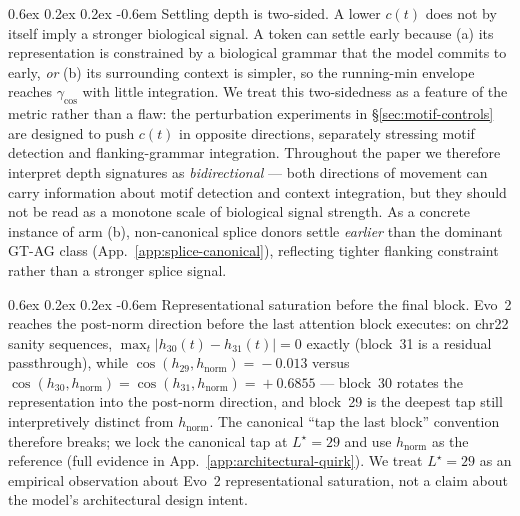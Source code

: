 \documentclass{article}
\makeatletter
\renewcommand\paragraph{\@startsection{paragraph}{4}{\z@}%
  {0.6ex \@plus 0.2ex \@minus 0.2ex}%
  {-0.6em}%
{\normalfont\normalsize\bfseries}}
\theoremstyle{plain}
\theoremstyle{definition}
\theoremstyle{remark}
\newcommand{\hnorm}{h_{\mathrm{norm}}}
\makeatother
\begin{document}
\paragraph{Settling depth is two-sided.} A lower $c(t)$ does not by itself imply a stronger biological signal. A token can settle early because (a) its representation is constrained by a biological grammar that the model commits to early, \emph{or} (b) its surrounding context is simpler, so the running-min envelope reaches $\gamma_{\cos}$ with little integration. We treat this two-sidedness as a feature of the metric rather than a flaw: the perturbation experiments in \S\ref{sec:motif-controls} are designed to push $c(t)$ in opposite directions, separately stressing motif detection and flanking-grammar integration. Throughout the paper we therefore interpret depth signatures as \emph{bidirectional} --- both directions of movement can carry information about motif detection and context integration, but they should not be read as a monotone scale of biological signal strength.
As a concrete instance of arm (b), non-canonical splice donors settle \emph{earlier} than the dominant GT-AG class (App.~\ref{app:splice-canonical}), reflecting tighter flanking constraint rather than a stronger splice signal.

\paragraph{Representational saturation before the final block.} Evo~2 reaches the post-norm direction before the last attention block executes: on chr22 sanity sequences, $\max_{t}|h_{30}(t)\!-\!h_{31}(t)|\!=\!0$ exactly (block~31 is a residual passthrough), while $\cos(h_{29},\hnorm)\!=\!-0.013$ versus $\cos(h_{30},\hnorm)\!=\!\cos(h_{31},\hnorm)\!=\!+0.6855$ --- block~30 rotates the representation into the post-norm direction, and block~29 is the deepest tap still interpretively distinct from $\hnorm$. The canonical ``tap the last block'' convention therefore breaks; we lock the canonical tap at $L^\star\!=\!29$ and use $\hnorm$ as the reference (full evidence in App.~\ref{app:architectural-quirk}). We treat $L^\star\!=\!29$ as an empirical observation about Evo~2 representational saturation, not a claim about the model's architectural design intent.
\end{document}
